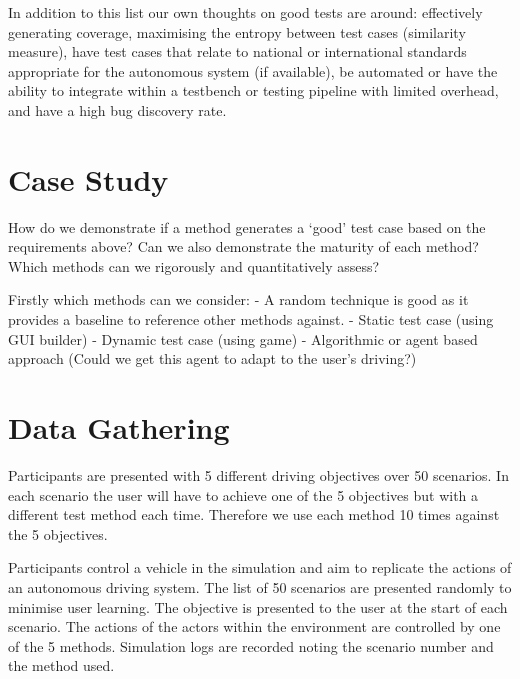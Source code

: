 \documentclass[letterpaper, 10 pt, journal, twoside]{IEEEtran}
\begin{document}
In addition to this list our own thoughts on good tests are around: effectively generating coverage, maximising the entropy between test cases (similarity measure), have test cases that relate to national or international standards appropriate for the autonomous system (if available), be automated or have the ability to integrate within a testbench or testing pipeline with limited overhead, and have a high bug discovery rate.


\section{Case Study}\label{s:Case Study}

How do we demonstrate if a method generates a `good' test case based on the requirements above? Can we also demonstrate the maturity of each method? Which methods can we rigorously and quantitatively assess?

Firstly which methods can we consider:
\newline - A random technique is good as it provides a baseline to reference other methods against.
\newline - Static test case (using GUI builder)
\newline - Dynamic test case (using game)
\newline - Algorithmic or agent based approach (Could we get this agent to adapt to the user's driving?)


\section{Data Gathering}\label{s:Data Gathering}


Participants are presented with 5 different driving objectives over 50 scenarios. In each scenario the user will have to achieve one of the 5 objectives but with a different test method each time. Therefore we use each method 10 times against the 5 objectives.

Participants control a vehicle in the simulation and aim to replicate the actions of an autonomous driving system. The list of 50 scenarios are presented randomly to minimise user learning. The objective is presented to the user at the start of each scenario. The actions of the actors within the environment are controlled by one of the 5 methods. Simulation logs are recorded noting the scenario number and the method used.
\end{document}

